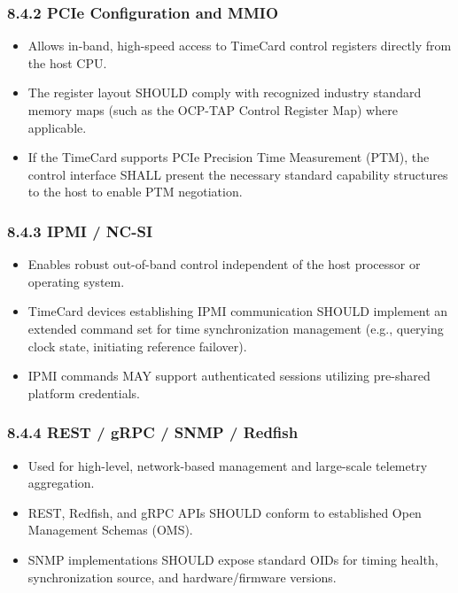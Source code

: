 \documentclass[
]{article}
\begin{document}
\subsubsection{8.4.2 PCIe Configuration and
MMIO}\label{pcie-configuration-and-mmio}

\begin{itemize}
\item
  Allows in-band, high-speed access to TimeCard control registers
  directly from the host CPU.
\item
  The register layout SHOULD comply with recognized industry standard
  memory maps (such as the OCP-TAP Control Register Map) where
  applicable.
\item
  If the TimeCard supports PCIe Precision Time Measurement (PTM), the
  control interface SHALL present the necessary standard capability
  structures to the host to enable PTM negotiation.
\end{itemize}

\subsubsection{8.4.3 IPMI / NC-SI}\label{ipmi-nc-si}

\begin{itemize}
\item
  Enables robust out-of-band control independent of the host processor
  or operating system.
\item
  TimeCard devices establishing IPMI communication SHOULD implement an
  extended command set for time synchronization management (e.g.,
  querying clock state, initiating reference failover).
\item
  IPMI commands MAY support authenticated sessions utilizing pre-shared
  platform credentials.
\end{itemize}

\subsubsection{8.4.4 REST / gRPC / SNMP /
Redfish}\label{rest-grpc-snmp-redfish}

\begin{itemize}
\item
  Used for high-level, network-based management and large-scale
  telemetry aggregation.
\item
  REST, Redfish, and gRPC APIs SHOULD conform to established Open
  Management Schemas (OMS).
\item
  SNMP implementations SHOULD expose standard OIDs for timing health,
  synchronization source, and hardware/firmware versions.
\end{itemize}
\end{document}

